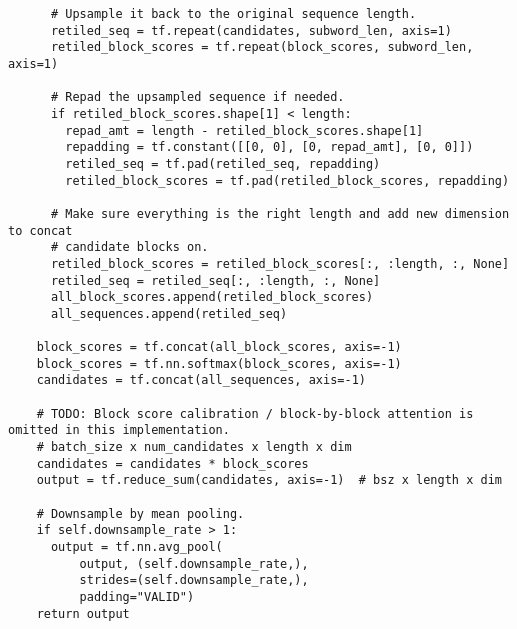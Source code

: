 \documentclass{article} \usepackage{iclr2022_conference,times}
\begin{document}
\begin{lstlisting}
      # Upsample it back to the original sequence length.
      retiled_seq = tf.repeat(candidates, subword_len, axis=1)
      retiled_block_scores = tf.repeat(block_scores, subword_len, axis=1)

      # Repad the upsampled sequence if needed.
      if retiled_block_scores.shape[1] < length:
        repad_amt = length - retiled_block_scores.shape[1]
        repadding = tf.constant([[0, 0], [0, repad_amt], [0, 0]])
        retiled_seq = tf.pad(retiled_seq, repadding)
        retiled_block_scores = tf.pad(retiled_block_scores, repadding)

      # Make sure everything is the right length and add new dimension to concat
      # candidate blocks on.
      retiled_block_scores = retiled_block_scores[:, :length, :, None]
      retiled_seq = retiled_seq[:, :length, :, None]
      all_block_scores.append(retiled_block_scores)
      all_sequences.append(retiled_seq)

    block_scores = tf.concat(all_block_scores, axis=-1)
    block_scores = tf.nn.softmax(block_scores, axis=-1)
    candidates = tf.concat(all_sequences, axis=-1)

    # TODO: Block score calibration / block-by-block attention is omitted in this implementation.
    # batch_size x num_candidates x length x dim
    candidates = candidates * block_scores
    output = tf.reduce_sum(candidates, axis=-1)  # bsz x length x dim

    # Downsample by mean pooling.
    if self.downsample_rate > 1:
      output = tf.nn.avg_pool(
          output, (self.downsample_rate,),
          strides=(self.downsample_rate,),
          padding="VALID")
    return output
\end{lstlisting}
\end{document}
